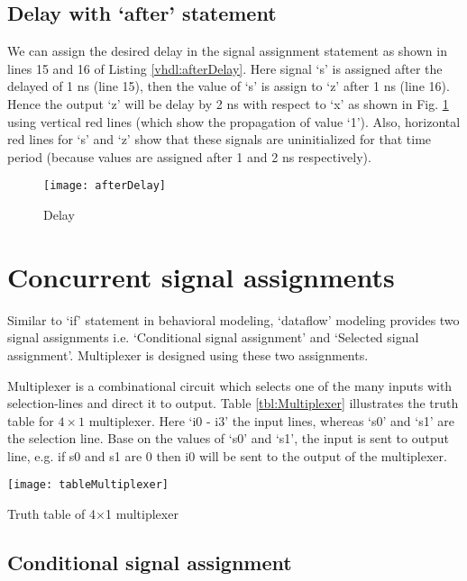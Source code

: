 \subsection{Delay with `after' statement}
We can assign the desired delay in the signal assignment statement as shown in lines 15 and 16 of Listing \ref{vhdl:afterDelay}. Here signal `s' is assigned after the delayed of 1 ns (line 15), then the value of `s' is assign to `z' after 1 ns (line 16). Hence the output `z' will be delay by 2 ns with respect to `x' as shown in Fig. \ref{fig:afterDelay} using vertical red lines (which show the propagation of value `1'). Also, horizontal red lines for `s' and `z' show that these signals are uninitialized for that time period (because values are assigned after 1 and 2 ns respectively). 




\begin{figure}[!h]
	\centering
	\texttt{[image: afterDelay]}
	\caption{Delay}
	\label{fig:afterDelay}
\end{figure}

\section{Concurrent signal assignments}
Similar to `if' statement in behavioral modeling, `dataflow' modeling provides two signal assignments i.e. `Conditional signal assignment' and `Selected signal assignment'. Multiplexer is designed using these two assignments. 

Multiplexer is a combinational circuit which selects one of the many inputs with selection-lines and direct it to output. Table \ref{tbl:Multiplexer} illustrates the truth table for $4\times 1$ multiplexer. Here `i0 - i3' the input lines, whereas `s0' and `s1' are the selection line. Base on the values of `s0' and `s1', the input is sent to output line, e.g. if s0 and s1 are 0 then i0 will be sent to the output of the multiplexer.

\begin{table}[!h]
	\centering
	\texttt{[image: tableMultiplexer]}
	\caption{Truth table of 4$\times$1 multiplexer}
	\label{tbl:Multiplexer}
\end{table}


\subsection{Conditional signal assignment}

